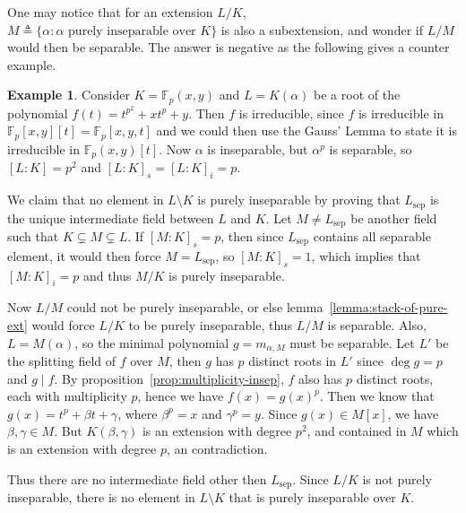 \documentclass[a4paper]{article}
\newcommand{\defeq}{\triangleq}
\newcommand{\Fb}{\mathbb{F}}
\theoremstyle{mystyle}
\theoremstyle{remark}
\theoremstyle{definition}
\newtheorem{example}{Example}
\theoremstyle{definition}
\begin{document}
  One may notice that for an extension $L/K$, $M \defeq \{ \alpha : \alpha \text{ purely inseparable over } K\}$
  is also a subextension, and wonder if $L/M$ would then be separable. The answer is negative as
  the following gives a counter example.

  \begin{example}
    Consider $K = \Fb_p(x, y)$ and $L = K(\alpha)$ be a root of the polynomial $f(t) = t^{p^2} + x t^p + y$.
    Then $f$ is irreducible, since $f$ is irreducible in $\Fb_p[x, y][t] = \Fb_p[x, y, t]$ and
    we could then use the Gauss' Lemma to state it is irreducible in $\Fb_p(x, y)[t]$.
    Now $\alpha$ is inseparable, but $\alpha^p$
    is separable, so $[L: K] = p^2$ and $[L: K]_s = [L: K]_i = p$.

    We claim that no element in $L \setminus K$ is purely inseparable by
    proving that $L_\text{sep}$ is the unique intermediate field between $L$ and $K$.
    Let $M \neq L_\text{sep}$ be another field such that $K \subsetneq M \subsetneq L$. If $[M: K]_s = p$,
    then since $L_\text{sep}$ contains all separable element, it would then force $M = L_\text{sep}$,
    so $[M: K]_s = 1$, which implies that $[M: K]_i = p$ and thus $M/K$ is purely inseparable.

    Now $L/M$ could not be purely inseparable, or else lemma~\ref{lemma:stack-of-pure-ext} would
    force $L/K$ to be purely inseparable, thus $L/M$ is separable. Also, $L = M(\alpha)$,
    so the minimal polynomial $g = m_{\alpha, M}$ must be separable. Let $L'$ be the splitting
    field of $f$ over $M$, then $g$ has $p$ distinct roots in $L'$ since $\deg g = p$ and $g \mid f$.
    By proposition~\ref{prop:multiplicity-insep}, $f$ also has $p$ distinct roots, each with multiplicity
    $p$, hence we have $f(x) = g(x)^p$. Then we know that $g(x) = t^p + \beta t + \gamma$, where
    $\beta^p = x$ and $\gamma^p = y$. Since $g(x) \in M[x]$, we have $\beta, \gamma \in M$.
    But $K(\beta, \gamma)$ is an extension with degree $p^2$, and contained in $M$
    which is an extension with degree $p$, an contradiction.

    Thus there are no intermediate field other then $L_\text{sep}$. Since $L/K$ is not purely
    inseparable, there is no element in $L \setminus K$ that is purely inseparable over $K$.
  \end{example}
\end{document}
